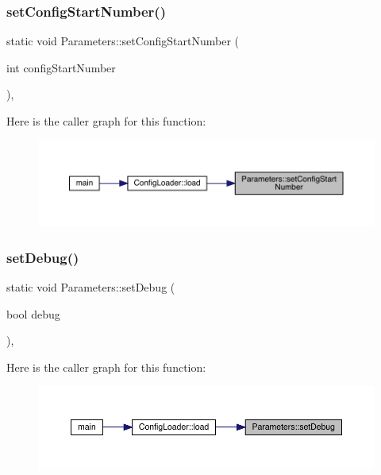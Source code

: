 \subsubsection{\texorpdfstring{setConfigStartNumber()}{setConfigStartNumber()}}
{\footnotesize\ttfamily static void Parameters\+::set\+Config\+Start\+Number (\begin{DoxyParamCaption}\item[{int}]{config\+Start\+Number }\end{DoxyParamCaption})\hspace{0.3cm}{\ttfamily [inline]}, {\ttfamily [static]}}

Here is the caller graph for this function\+:\nopagebreak
\begin{figure}[H]
\begin{center}
\leavevmode
\includegraphics[width=350pt]{class_parameters_a4863c437df48cd3242fdb67221a3d6ed_icgraph}
\end{center}
\end{figure}
\mbox{\label{class_parameters_a6b0d9bf17b3c8096c3454d291e086ac2}} 
\subsubsection{\texorpdfstring{setDebug()}{setDebug()}}
{\footnotesize\ttfamily static void Parameters\+::set\+Debug (\begin{DoxyParamCaption}\item[{bool}]{debug }\end{DoxyParamCaption})\hspace{0.3cm}{\ttfamily [inline]}, {\ttfamily [static]}}

Here is the caller graph for this function\+:\nopagebreak
\begin{figure}[H]
\begin{center}
\leavevmode
\includegraphics[width=350pt]{class_parameters_a6b0d9bf17b3c8096c3454d291e086ac2_icgraph}
\end{center}
\end{figure}
\mbox{\label{class_parameters_abbcb8f09dfec507ec29caa248819522b}} 

